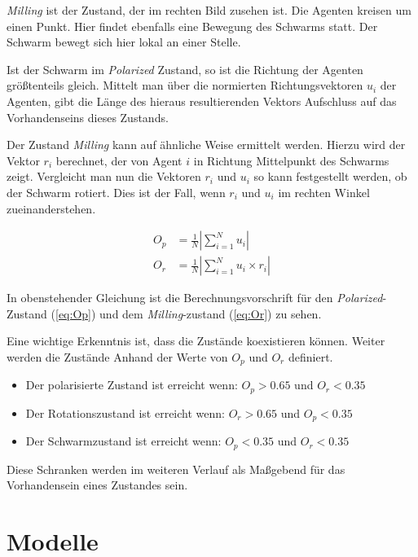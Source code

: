 \textit{Milling} ist der Zustand, der im rechten Bild zusehen ist. Die Agenten kreisen um einen Punkt. Hier findet ebenfalls eine Bewegung des Schwarms statt. Der Schwarm bewegt sich hier lokal an einer Stelle.


Ist der Schwarm im \textit{Polarized} Zustand, so ist die Richtung der Agenten größtenteils gleich. Mittelt man über die normierten Richtungsvektoren $u_i$ der Agenten, gibt die Länge des hieraus resultierenden Vektors Aufschluss auf das Vorhandenseins dieses Zustands.

Der Zustand \textit{Milling} kann auf ähnliche Weise ermittelt werden. Hierzu wird der Vektor $r_i$ berechnet, der von Agent $i$ in Richtung Mittelpunkt des Schwarms zeigt. Vergleicht man nun die Vektoren $r_i$ und $u_i$ so kann festgestellt werden, ob der Schwarm rotiert.
Dies ist der Fall, wenn $r_i$ und $u_i$ im rechten Winkel zueinanderstehen.


\begin{subequations}
\begin{align}
O_p &= \frac{1}{N} \left\vert \sum_{i=1}^{N}u_i\right\vert \label{eq:Op} \\
O_r &= \frac{1}{N} \left\vert \sum_{i=1}^{N}u_i \times r_i\right\vert \label{eq:Or}
\end{align}
\end{subequations}

In obenstehender Gleichung ist die Berechnungsvorschrift für den \textit{Polarized}-Zustand (\ref{eq:Op}) und dem \textit{Milling}-zustand (\ref{eq:Or}) zu sehen.



Eine wichtige Erkenntnis ist, dass die Zustände koexistieren können. 
Weiter werden die Zustände Anhand der Werte von $O_p$ und $O_r$ definiert.
\begin{itemize}
	\item Der polarisierte Zustand ist erreicht wenn: $O_p > 0.65$ und $O_r < 0.35$ 
	\item Der Rotationszustand ist erreicht wenn: $O_r > 0.65$ und $O_p < 0.35$ 
	\item Der Schwarmzustand ist erreicht wenn: $O_p < 0.35$ und $O_r < 0.35$ 
\end{itemize}

Diese Schranken werden im weiteren Verlauf als Maßgebend für das Vorhandensein eines Zustandes sein.

\section{Modelle}\label{sec:Modelle}


